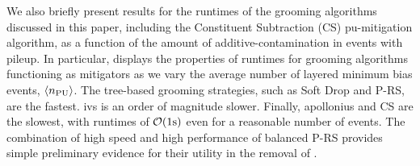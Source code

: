 \begin{subappendices}
We also briefly present results for the runtimes of the grooming algorithms discussed in this paper, including the Constituent Subtraction (CS) \gls{pu-mitigation} algorithm, as a function of the amount of \gls{additive-contamination} in events with \gls{pileup}.
%
In particular,  displays the properties of runtimes for grooming algorithms functioning as  mitigators as we vary the average number of layered minimum bias events, \(\langle n_{\rm PU} \rangle\).
%
The tree-based grooming strategies, such as Soft Drop and P-RS, are the fastest.
%
\gls{ivs} is an order of magnitude slower.
%
Finally, \gls{apollonius} and CS are the slowest, with runtimes of \(\mathcal O({\rm 1s})\) even for a reasonable number of  events.
%
The combination of high speed and high performance of balanced P-RS provides simple preliminary evidence for their utility in the removal of .
\\~\\


\end{subappendices}
